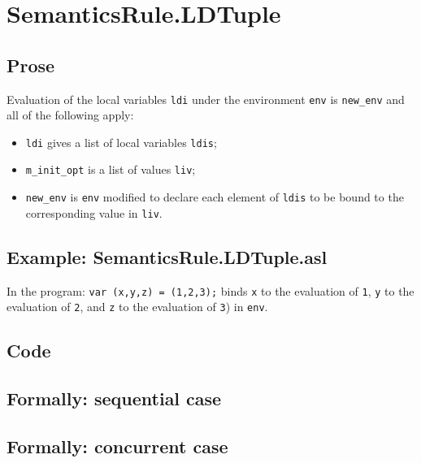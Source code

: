 \documentclass{book}
\begin{document}

\section{SemanticsRule.LDTuple \label{sec:SemanticsRule.LDTuple}}

    \subsection{Prose}
Evaluation of the local variables \texttt{ldi} under the environment
\texttt{env} is \texttt{new\_env} and all of the following apply:
    \begin{itemize}
    \item \texttt{ldi} gives a list of local variables \texttt{ldis};
    \item \texttt{m\_init\_opt} is a list of values \texttt{liv};
    \item \texttt{new\_env} is \texttt{env} modified to declare each element of \texttt{ldis} to be bound
      to the corresponding value in \texttt{liv}.
    \end{itemize}

    \subsection{Example: SemanticsRule.LDTuple.asl}
    In the program:
    \texttt{var (x,y,z) = (1,2,3);} binds \texttt{x} to the evaluation of
\texttt{1}, \texttt{y} to the evaluation of \texttt{2}, and \texttt{z} to the
evaluation of \texttt{3}) in \texttt{env}.

  \subsection{Code}

\begin{emptyformal}
  \subsection{Formally: sequential case}

  \subsection{Formally: concurrent case}
\end{emptyformal}
\end{document}
